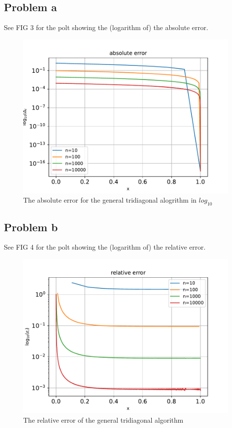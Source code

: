 \documentclass[english,notitlepage]{revtex4-1}  %
\begin{document}
	\subsection*{Problem a}
	See FIG 3 for the polt showing the (logarithm of) the absolute error.
		\begin{figure}[H]
			\centering
			\includegraphics[scale=0.55]{plots/absolute_error.pdf} %
			\caption{The absolute error for the general tridiagonal alogrithm in $log_{10}$}
			\label{fig:absolute_error}
		\end{figure}

	\subsection*{Problem b}
	See FIG 4 for the polt showing the (logarithm of) the relative error.
		\begin{figure}[H]
			\centering
			\includegraphics[scale=0.55]{plots/relative_error.pdf} %
			\caption{The relative error of the general tridiagonal algorithm}
			\label{fig:relative_error}
		\end{figure}
\end{document}
